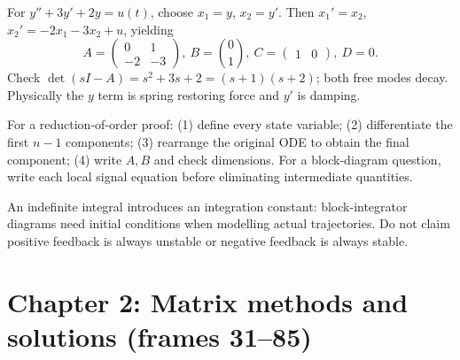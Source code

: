 \documentclass[10pt,a4paper]{article}
\begin{document}
\begin{workbox}[title={WORKED: damped harmonic oscillator}]
For $y''+3y'+2y=u(t)$, choose $x_1=y$, $x_2=y'$. Then $x_1'=x_2$, $x_2'=-2x_1-3x_2+u$, yielding
\[A=\begin{pmatrix}0&1\\-2&-3\end{pmatrix},\ B=\binom01,\ C=\begin{pmatrix}1&0\end{pmatrix},\ D=0.\]
Check $\det(sI-A)=s^2+3s+2=(s+1)(s+2)$; both free modes decay. Physically the $y$ term is spring restoring force and $y'$ is damping.
\end{workbox}
\begin{exambox}For a reduction-of-order proof: (1) define every state variable; (2) differentiate the first $n-1$ components; (3) rearrange the original ODE to obtain the final component; (4) write $A,B$ and check dimensions. For a block-diagram question, write each local signal equation before eliminating intermediate quantities.\end{exambox}
\begin{warnbox}An indefinite integral introduces an integration constant: block-integrator diagrams need initial conditions when modelling actual trajectories. Do not claim positive feedback is always unstable or negative feedback is always stable.\end{warnbox}


\section{Chapter 2: Matrix methods and solutions (frames 31--85)}
\end{document}
